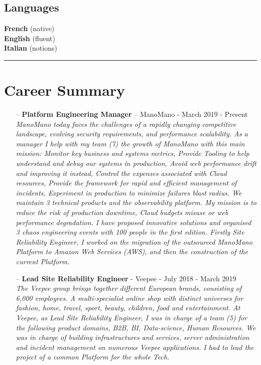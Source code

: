 \documentclass[a4paper,11pt]{article}
\newcommand{\breakvspace}[1]{\pagebreak[2]\vspace{#1}\pagebreak[2]}
\newcommand{\nobreakvspace}[1]{\nopagebreak[4]\vspace{#1}\nopagebreak[4]}
\newcommand{\spacedhrule}[2]{\breakvspace{#1}\hrule\nobreakvspace{#2}}
\begin{document}
\begin{itemize}
\begin{minipage}[t]{0.28\textwidth}
    \subsection*{Languages}
    \textbf{French} (native)\\
    \textbf{English} (fluent)\\
    \textbf{Italian} (notions)
  \end{minipage}


\spacedhrule{1.5em}{-0.4em}

\section*{Career Summary}

  \begin{itemize}
    \item[--]
      \textbf{Platform Engineering Manager} – ManoMano - March 2019 - Present\\
      \textit{ManoMano today faces the challenges of a rapidly changing competitive landscape, evolving security requirements, and performance scalability. As a manager I help with my team (7) the growth of ManoMano with this main mission:
        Monitor key business and systems metrics, Provide Tooling to help understand and debug our systems in production, Avoid web performance drift and improving it instead, Control the expenses associated with Cloud resources, Provide the framework for rapid and efficient management of incidents, Experiment in production to minimize failures blast radius. We maintain 3 technical products and the observability platform. My mission is to reduce the risk of production downtime, Cloud budgets misuse or web performance degradation. I have proposed innovative solutions and organised 3 chaos engineering events with 100 people in the first edition. Firstly Site Reliability Engineer, I worked on the migration of the outsourced ManoMano Platform to Amazon Web Services (AWS), and then the construction of the current Platform.} 
    \item[--]
      \textbf{Lead Site Reliability Engineer} - Veepee - July 2018 - March 2019 \\
      \textit{The Veepee group brings together different European brands, consisting of 6,000 employees. A multi-specialist online shop with distinct universes for fashion, home, travel, sport, beauty, children, food and entertainment. At Veepee, as Lead Site Reliability Engineer, I was in charge of a team (5) for the following product domains, B2B, BI, Data-science, Human Resources. We was in charge of building infrastructures and services, server administration and incident management on numerous Veepee applications. I had to lead the project of a common Platform for the whole Tech.}

\end{itemize}
\end{itemize}
\end{document}
